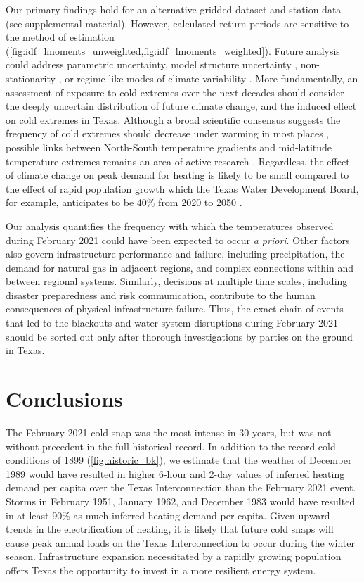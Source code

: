 \documentclass[12pt]{iopart}
\begin{document}
Our primary findings hold for an alternative gridded dataset and station data (see supplemental material).
However, calculated return periods are sensitive to the method of estimation (\cref{fig:idf_lmoments_unweighted,fig:idf_lmoments_weighted}).
Future analysis could address parametric uncertainty, model structure uncertainty \cite{wong_floodrisk:2018}, non-stationarity \cite{Milly:2008dg}, or regime-like modes of climate variability \cite{DossGollin:2019}.
More fundamentally, an assessment of exposure to cold extremes over the next decades should consider the deeply uncertain distribution of future climate change, and the induced effect on cold extremes in Texas.
Although a broad scientific consensus suggests the frequency of cold extremes should decrease under warming in most places \cite{ipcc_ar5:2014}, possible links between North-South temperature gradients and mid-latitude temperature extremes remains an area of active research \cite{Barnes:2013fp,Cohen:2014gx,Screen:2013ho,romanowsky_stratosphere:2019}.
Regardless, the effect of climate change on peak demand for heating is likely to be small compared to the effect of rapid population growth which the Texas Water Development Board, for example, anticipates to be 40\% from 2020 to 2050 \cite{texaswaterplan:2012}.

Our analysis quantifies the frequency with which the temperatures observed during February 2021 could have been expected to occur \emph{a priori}.
Other factors also govern infrastructure performance and failure, including precipitation, the demand for natural gas in adjacent regions, and complex connections within and between regional systems.
Similarly, decisions at multiple time scales, including disaster preparedness and risk communication, contribute to the human consequences of physical infrastructure failure.
Thus, the exact chain of events that led to the blackouts and water system disruptions during February 2021 should be sorted out only after thorough investigations by parties on the ground in Texas.

\section{Conclusions}

The February 2021 cold snap was the most intense in 30 years, but was not without precedent in the full historical record.
In addition to the record cold conditions of 1899 (\cref{fig:historic_bk}), we estimate that the weather of December 1989 would have resulted in higher 6-hour and 2-day values of inferred heating demand per capita over the Texas Interconnection than the February 2021 event.
Storms in February 1951, January 1962, and December 1983 would have resulted in at least 90\% as much inferred heating demand per capita.
Given upward trends in the electrification of heating, it is likely that future cold snaps will cause peak annual loads on the Texas Interconnection to occur during the winter season.
Infrastructure expansion necessitated by a rapidly growing population offers Texas the opportunity to invest in a more resilient energy system.
\end{document}
